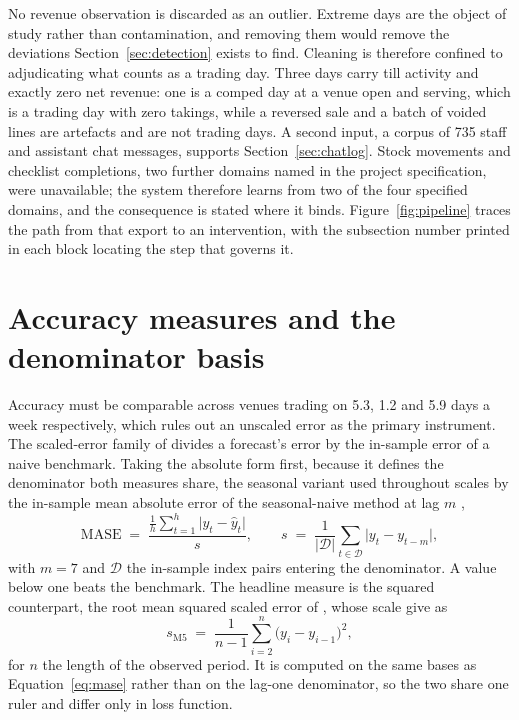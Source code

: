 No revenue observation is discarded as an outlier. Extreme days are the object of study rather
than contamination, and removing them would remove the deviations
Section~\ref{sec:detection} exists to find. Cleaning is therefore confined to adjudicating what
counts as a trading day. Three days carry till activity and exactly zero net revenue: one is a
comped day at a venue open and serving, which is a trading day with zero takings, while a
reversed sale and a batch of voided lines are artefacts and are not trading days. A second
input, a corpus of 735 staff and assistant chat messages, supports
Section~\ref{sec:chatlog}. Stock movements and checklist completions, two further domains named
in the project specification, were unavailable; the system therefore learns from two of the four
specified domains, and the consequence is stated where it binds. Figure~\ref{fig:pipeline} traces
the path from that export
to an intervention, with the subsection number printed in each block locating the step that
governs it.

\section{Accuracy measures and the denominator basis}
\label{sec:ruler}

Accuracy must be comparable across venues trading on 5.3, 1.2 and 5.9 days a week respectively,
which rules out an unscaled error as the primary instrument. The scaled-error family of
\citet{hyndman_another_2006} divides a forecast's error by the in-sample error of a naive
benchmark. Taking the absolute form first, because it defines the denominator both measures
share, the seasonal variant used throughout scales by the in-sample mean absolute error of the
seasonal-naive method at lag $m$ \citep{hyndman_forecasting_2021},
\begin{equation}
\mathrm{MASE} \;=\; \frac{\frac{1}{h}\sum_{t=1}^{h}\lvert y_t - \hat{y}_t\rvert}{s},
\qquad
s \;=\; \frac{1}{\lvert \mathcal{D}\rvert}\sum_{t \in \mathcal{D}} \bigl\lvert y_t -
y_{t-m}\bigr\rvert,
\label{eq:mase}
\end{equation}
with $m = 7$ and $\mathcal{D}$ the in-sample index pairs entering the denominator. A value below
one beats the benchmark. The headline measure is the squared counterpart, the root mean squared
scaled error of \citet{makridakis_m5_2022}, whose scale \citet{hewamalage_look_2021} give as
\begin{equation}
s_{\mathrm{M5}} \;=\; \frac{1}{n-1}\sum_{i=2}^{n}\bigl(y_i - y_{i-1}\bigr)^2 ,
\label{eq:rmsse-m5}
\end{equation}
for $n$ the length of the observed period. It is computed on the same bases as
Equation~\ref{eq:mase} rather than on the lag-one denominator, so the two share one ruler and
differ only in loss function.

